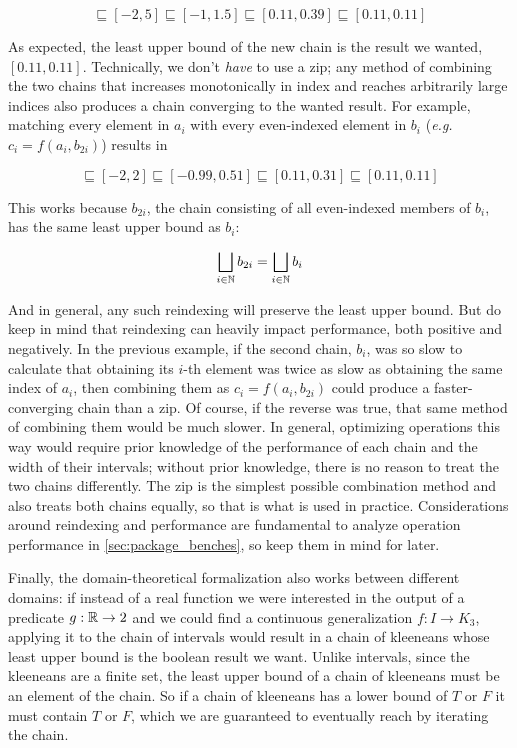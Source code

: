 \begin{equation*}
  [-2, 12] \sqsubseteq [-2, 5] \sqsubseteq [-1, 1.5] \sqsubseteq [0.11, 0.39] \sqsubseteq [0.11, 0.11]
\end{equation*}

As expected, the least upper bound of the new chain is the result we wanted, $[0.11, 0.11]$. Technically, we don't \textit{have} to use a zip; any method of combining the two chains that increases monotonically in index and reaches arbitrarily large indices also produces a chain converging to the wanted result. For example, matching every element in $a_i$ with every even-indexed element in $b_i$ (\textit{e.g.} $c_i = f(a_i, b_{2i})$) results in

\begin{equation*}
  [-2, 12] \sqsubseteq [-2, 2] \sqsubseteq [-0.99, 0.51] \sqsubseteq [0.11, 0.31] \sqsubseteq [0.11, 0.11]
\end{equation*}

This works because $b_{2i}$, the chain consisting of all even-indexed members of $b_i$, has the same least upper bound as $b_i$:

\begin{equation*}
  \bigsqcup_{i \in \mathbb{N}} b_{2i} = \bigsqcup_{i \in \mathbb{N}} b_i
\end{equation*}

And in general, any such reindexing will preserve the least upper bound. But do keep in mind that reindexing can heavily impact performance, both positive and negatively. In the previous example, if the second chain, $b_i$, was so slow to calculate that obtaining its $i$-th element was twice as slow as obtaining the same index of $a_i$, then combining them as $c_i = f(a_i, b_{2i})$ could produce a faster-converging chain than a zip. Of course, if the reverse was true, that same method of combining them would be much slower. In general, optimizing operations this way would require prior knowledge of the performance of each chain and the width of their intervals; without prior knowledge, there is no reason to treat the two chains differently. The zip is the simplest possible combination method and also treats both chains equally, so that is what is used in practice. Considerations around reindexing and performance are fundamental to analyze operation performance in \cref{sec:package_benches}, so keep them in mind for later.

Finally, the domain-theoretical formalization also works between different domains: if instead of a real function we were interested in the output of a predicate $g: \mathbb{R} \rightarrow 2$ and we could find a continuous generalization $f: I \rightarrow K_3$, applying it to the chain of intervals would result in a chain of kleeneans whose least upper bound is the boolean result we want. Unlike intervals, since the kleeneans are a finite set, the least upper bound of a chain of kleeneans must be an element of the chain. So if a chain of kleeneans has a lower bound of $T$ or $F$ it must contain $T$ or $F$, which we are guaranteed to eventually reach by iterating the chain.

